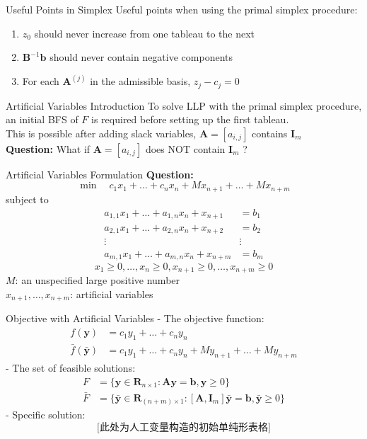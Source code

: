\documentclass[aspectratio=169,hyperref,UTF8,CJK]{beamer}
\begin{document}
\begin{frame}{Useful Points in Simplex}
Useful points when using the primal simplex procedure:
\begin{enumerate}
    \item \(z_0\) should never increase from one tableau to the next
    \item \(\mathbf{B}^{-1}\mathbf{b}\) should never contain negative components
    \item For each \(\mathbf{A}^{(j)}\) in the admissible basis, \(z_j - c_j = 0\)
\end{enumerate}
\end{frame}

\begin{frame}{Artificial Variables Introduction}
To solve LLP with the primal simplex procedure, an initial BFS of \(F\) is required before setting up the first tableau. \\
This is possible after adding slack variables, \(\mathbf{A} = [a_{i,j}]\) contains \(\mathbf{I}_{m}\) \\
\textbf{Question:} What if \(\mathbf{A} = [a_{i,j}]\) does NOT contain \(\mathbf{I}_{m}\) ?
\end{frame}

\begin{frame}{Artificial Variables Formulation}
\textbf{Question:}
\[
\min \quad c_1x_1 + \dots + c_nx_n + Mx_{n+1} + \dots + Mx_{n+m}
\]
subject to
\begin{align*}
a_{1,1}x_1 + \dots + a_{1,n}x_n + x_{n+1} &= b_1 \\
a_{2,1}x_1 + \dots + a_{2,n}x_n + x_{n+2} &= b_2 \\
\vdots & \vdots \\
a_{m,1}x_1 + \dots + a_{m,n}x_n + x_{n+m} &= b_m
\end{align*}
\[
x_1 \ge 0, \dots, x_n \ge 0, x_{n+1} \ge 0, \dots, x_{n+m} \ge 0
\]
\(M\): an unspecified large positive number \\
\(x_{n+1}, \dots, x_{n+m}\): artificial variables
\end{frame}

\begin{frame}{Objective with Artificial Variables}
- The objective function:
\begin{align*}
f(\mathbf{y}) &= c_1y_1 + \dots +c_ny_n \\
\bar{f}(\bar{\mathbf{y}}) &= c_1y_1 + \dots +c_ny_n + My_{n+1} + \dots +My_{n+m}
\end{align*}
- The set of feasible solutions:
\begin{align*}
F &= \{\mathbf{y}\in \mathbf{R}_{n\times 1}:\mathbf{A}\mathbf{y} = \mathbf{b},\mathbf{y}\geq 0\} \\
\bar{F} &= \{\bar{\mathbf{y}}\in \mathbf{R}_{(n + m)\times 1}:[\mathbf{A},\mathbf{I}_m]\bar{\mathbf{y}} = \mathbf{b},\bar{\mathbf{y}}\geq 0\}
\end{align*}
- Specific solution:
\[
\textit{[此处为人工变量构造的初始单纯形表格]}
\]
\end{frame}
\end{document}
